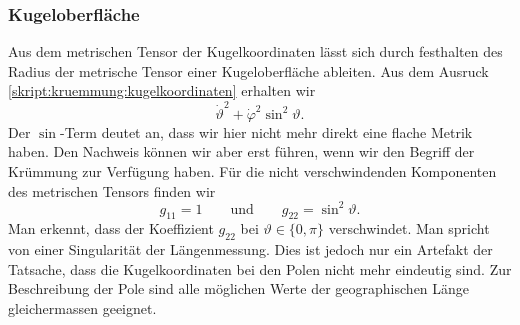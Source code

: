 \subsubsection{Kugeloberfläche}
Aus dem metrischen Tensor der Kugelkoordinaten lässt sich durch festhalten
des Radius der metrische Tensor einer Kugeloberfläche ableiten.
Aus dem Ausruck \eqref{skript:kruemmung:kugelkoordinaten}
erhalten wir
\[
\dot\vartheta^2+\dot\varphi^2\sin^2\vartheta.
\]
Der $\sin$-Term deutet an, dass wir hier nicht mehr direkt eine flache
Metrik haben.
Den Nachweis können wir aber erst führen, wenn wir den Begriff der
Krümmung zur Verfügung haben.
Für die nicht verschwindenden Komponenten des metrischen Tensors
finden wir
\[
g_{11} = 1
\qquad\text{und}\qquad
g_{22}=\sin^2\vartheta.
\]
Man erkennt, dass der Koeffizient $g_{22}$ bei $\vartheta \in\{0,\pi\}$
verschwindet.
Man spricht von einer Singularität der Längenmessung.
Dies ist jedoch nur ein Artefakt der Tatsache, dass die Kugelkoordinaten
bei den Polen nicht mehr eindeutig sind.
Zur Beschreibung der Pole sind alle möglichen Werte der geographischen
Länge gleichermassen geeignet.



